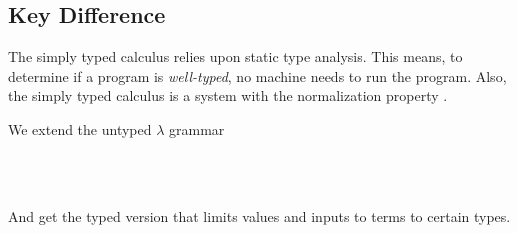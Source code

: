 \subsection{Key Difference}

The simply typed calculus relies upon static type analysis.
This means, to determine if a program is \textit{well-typed}, no
machine needs to run the program. Also, the simply typed calculus is
a system with the normalization property \cite{pierce2002ProgLang}
\cite{baader_nipkow_1998}.

We extend the untyped $\lambda$ grammar

\begin{bnf*}
    { \bnfsp {}}\\
    \bnfmore{}
    { \bnfsp {}}\\
    \bnfmore{}
    {  \bnfsp {}}
\end{bnf*}

And get the typed version that limits values and
inputs to terms to certain types.

\begin{bnf*}
    { \bnfsp {}}\\
    \bnfmore{}
    { \bnfsp {}}\\
    \bnfmore{}
    {  \bnfsp {}}
\end{bnf*}
